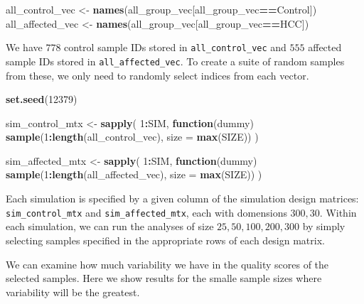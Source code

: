 \documentclass[
]{book}
\newenvironment{Shaded}{\begin{snugshade}}{\end{snugshade}}
\newcommand{\ControlFlowTok}[1]{\textcolor[rgb]{0.13,0.29,0.53}{\textbf{#1}}}
\newcommand{\DataTypeTok}[1]{\textcolor[rgb]{0.13,0.29,0.53}{#1}}
\newcommand{\DecValTok}[1]{\textcolor[rgb]{0.00,0.00,0.81}{#1}}
\newcommand{\KeywordTok}[1]{\textcolor[rgb]{0.13,0.29,0.53}{\textbf{#1}}}
\newcommand{\NormalTok}[1]{#1}
\newcommand{\OperatorTok}[1]{\textcolor[rgb]{0.81,0.36,0.00}{\textbf{#1}}}
\newcommand{\StringTok}[1]{\textcolor[rgb]{0.31,0.60,0.02}{#1}}
\begin{document}
\begin{Shaded}
\begin{Highlighting}[]
\NormalTok{all\_control\_vec <{-}}\StringTok{ }\KeywordTok{names}\NormalTok{(all\_group\_vec[all\_group\_vec}\OperatorTok{==}\StringTok{\textquotesingle{}Control\textquotesingle{}}\NormalTok{]) }
\NormalTok{all\_affected\_vec <{-}}\StringTok{ }\KeywordTok{names}\NormalTok{(all\_group\_vec[all\_group\_vec}\OperatorTok{==}\StringTok{\textquotesingle{}HCC\textquotesingle{}}\NormalTok{])  }
\end{Highlighting}
\end{Shaded}

We have \(778\) control sample IDs stored in \texttt{all\_control\_vec}
and \(555\) affected sample IDs stored in \texttt{all\_affected\_vec}.
To create a suite of random samples from these, we only need to randomly select indices from
each vector.

\begin{Shaded}
\begin{Highlighting}[]
\KeywordTok{set.seed}\NormalTok{(}\DecValTok{12379}\NormalTok{)}

\NormalTok{sim\_control\_mtx <{-}}\StringTok{ }\KeywordTok{sapply}\NormalTok{(}
 \DecValTok{1}\OperatorTok{:}\NormalTok{SIM, }
 \ControlFlowTok{function}\NormalTok{(dummy) }
   \KeywordTok{sample}\NormalTok{(}\DecValTok{1}\OperatorTok{:}\KeywordTok{length}\NormalTok{(all\_control\_vec), }\DataTypeTok{size =}  \KeywordTok{max}\NormalTok{(SIZE))}
\NormalTok{)}


\NormalTok{sim\_affected\_mtx <{-}}\StringTok{ }\KeywordTok{sapply}\NormalTok{(}
 \DecValTok{1}\OperatorTok{:}\NormalTok{SIM, }
 \ControlFlowTok{function}\NormalTok{(dummy) }
   \KeywordTok{sample}\NormalTok{(}\DecValTok{1}\OperatorTok{:}\KeywordTok{length}\NormalTok{(all\_affected\_vec), }\DataTypeTok{size =}  \KeywordTok{max}\NormalTok{(SIZE))}
\NormalTok{)}
\end{Highlighting}
\end{Shaded}

Each simulation is specified by a given column of the simulation design matrices:
\texttt{sim\_control\_mtx} and \texttt{sim\_affected\_mtx}, each with domensions \(300, 30\).
Within each simulation, we can run the analyses of size \(25, 50, 100, 200, 300\) by simply selecting
samples specified in the appropriate rows of each design matrix.

We can examine how much variability we have in the quality scores of the selected samples.
Here we show results for the smalle sample sizes where variability will be the greatest.
\end{document}
